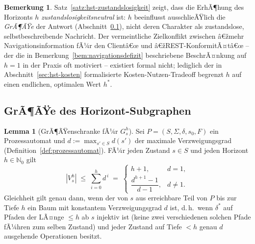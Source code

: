 ﻿\documentclass[a4paper,12pt]{article}
\theoremstyle{definition}
\newtheorem{lemma}{Lemma}
\newtheorem{bemerkung}{Bemerkung}
\begin{document}
\begin{bemerkung}
	\label{bem:zustandslosigkeit-frei}
	Satz~\ref{satz:hst-zustandslosigkeit} zeigt, dass die ErhÃ¶hung des Horizonts $h$
	\emph{zustandslosigkeitsneutral} ist: $h$ beeinflusst ausschlieÃŸlich die
	\emph{GrÃ¶ÃŸe} der Antwort (Abschnitt~\ref{sec:hst-groesse}), nicht deren Charakter als
	zustandslose, selbstbeschreibende Nachricht. Der vermeintliche Zielkonflikt zwischen
	â€žmehr Navigationsinformation fÃ¼r den Clientâ€œ und â€žREST-KonformitÃ¤tâ€œ -- der die in
	Bemerkung~\ref{bem:navigationsdefizit} beschriebene BeschrÃ¤nkung auf $h=1$ in der
	Praxis oft motiviert -- existiert formal nicht; lediglich der in
	Abschnitt~\ref{sec:hst-kosten} formalisierte Kosten-Nutzen-Tradeoff begrenzt $h$ auf
	einen endlichen, optimalen Wert $h^\ast$.
\end{bemerkung}
\subsection{GrÃ¶ÃŸe des Horizont-Subgraphen}
\label{sec:hst-groesse}

\begin{lemma}[GrÃ¶ÃŸenschranke fÃ¼r $G_s^h$]
	\label{lem:horizont-groesse}
	Sei $P=(S,\Sigma,\delta,s_0,F)$ ein Prozessautomat und $d:=\max_{s'\in S}d(s')$ der
	maximale Verzweigungsgrad (Definition~\ref{def:prozessautomat}). FÃ¼r jeden Zustand
	$s\in S$ und jeden Horizont $h\in\mathbb{N}_0$ gilt
	\[
		|V_s^h| \;\le\; \sum_{i=0}^{h} d^{\,i} \;=\;
		\begin{cases}
			h+1, & d=1,\\[2pt]
			\dfrac{d^{h+1}-1}{d-1}, & d\ne1.
		\end{cases}
	\]
	Gleichheit gilt genau dann, wenn der von $s$ aus erreichbare Teil von $P$ bis zur
	Tiefe $h$ ein Baum mit konstantem Verzweigungsgrad $d$ ist, d.\,h.\ wenn
	$\delta^{*}$ auf Pfaden der LÃ¤nge $\le h$ ab $s$ injektiv ist (keine zwei
	verschiedenen solchen Pfade fÃ¼hren zum selben Zustand) und jeder Zustand auf Tiefe
	$<h$ genau $d$ ausgehende Operationen besitzt.
\end{lemma}
\end{document}
